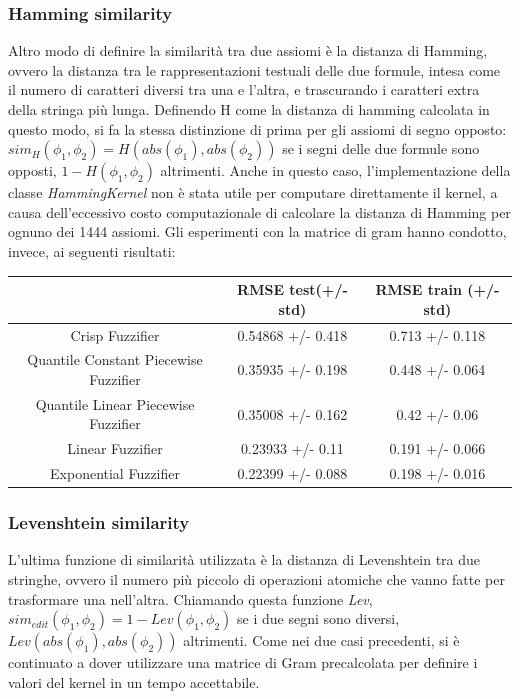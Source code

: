 \documentclass[12pt,a4paper]{report}
\begin{document}
\subsubsection{Hamming similarity}
Altro modo di definire la similarità tra due assiomi è la distanza di Hamming, ovvero la distanza tra le rappresentazioni testuali delle due formule, intesa come il numero di caratteri diversi tra una e l'altra, e trascurando i caratteri extra della stringa più lunga.
Definendo H come la distanza di hamming calcolata in questo modo, si fa la stessa distinzione di prima per gli assiomi di segno opposto:  $sim_{H}(\phi_1, \phi_2) = H(abs(\phi_1),abs(\phi_2))$ se i segni delle due formule sono opposti, $1 - H(\phi_1, \phi_2)$ altrimenti.
Anche in questo caso, l'implementazione della classe \emph{HammingKernel} non è stata utile per computare direttamente il kernel, a causa dell'eccessivo costo computazionale di calcolare la distanza di Hamming per ognuno dei 1444 assiomi. Gli esperimenti con la matrice di gram hanno condotto, invece, ai seguenti risultati:

\begin{table}[h!]
\centering 	
	\begin{tabular}{|c|c|c|} 
	 \hline
	  & RMSE test(+/- std) & RMSE train (+/- std)\\ [0.5ex] 
	 \hline
	 Crisp Fuzzifier & 0.54868 +/- 0.418 & 0.713 +/- 0.118 \\ 
	 \hline
	 Quantile Constant Piecewise Fuzzifier & 0.35935 +/- 0.198 & 0.448 +/- 0.064\\
	 \hline
	 Quantile Linear Piecewise Fuzzifier & 0.35008 +/- 0.162 & 0.42 +/- 0.06\\
	 \hline
	 Linear Fuzzifier &0.23933 +/- 0.11 & 0.191 +/- 0.066\\
	 \hline
	 Exponential Fuzzifier & 0.22399 +/- 0.088 & 0.198 +/- 0.016\\ [1ex] 
	 \hline
	\end{tabular}
\end{table}

\subsubsection{Levenshtein similarity}
L'ultima funzione di similarità utilizzata è la distanza di Levenshtein tra due stringhe, ovvero il numero più piccolo di operazioni atomiche che vanno fatte per trasformare una nell'altra. Chiamando questa funzione \emph{Lev}, $sim_{edit}(\phi_1, \phi_2) = 1 - Lev(\phi_1,\phi_2)$ se i due segni sono diversi, $Lev(abs(\phi_1),abs(\phi_2))$ altrimenti.
Come nei due casi precedenti, si è continuato a dover utilizzare una matrice di Gram precalcolata per definire i valori del kernel in un tempo accettabile.
\end{document}
